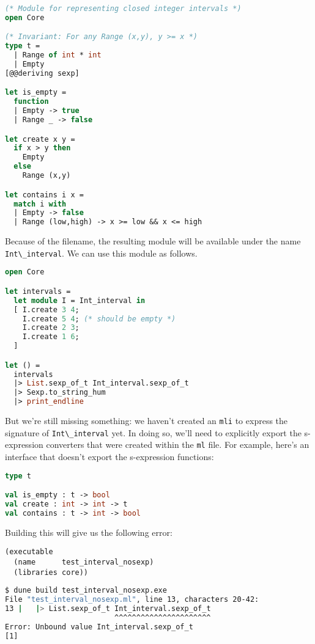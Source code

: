 \begin{lstlisting}[language=Caml]
(* Module for representing closed integer intervals *)
open Core

(* Invariant: For any Range (x,y), y >= x *)
type t =
  | Range of int * int
  | Empty
[@@deriving sexp]

let is_empty =
  function
  | Empty -> true
  | Range _ -> false

let create x y =
  if x > y then
    Empty
  else
    Range (x,y)

let contains i x =
  match i with
  | Empty -> false
  | Range (low,high) -> x >= low && x <= high
\end{lstlisting}

Because of the filename, the resulting module will be available under
the name \passthrough{\lstinline!Int\_interval!}. We can use this module
as follows.

\begin{lstlisting}[language=Caml]
open Core

let intervals =
  let module I = Int_interval in
  [ I.create 3 4;
    I.create 5 4; (* should be empty *)
    I.create 2 3;
    I.create 1 6;
  ]

let () =
  intervals
  |> List.sexp_of_t Int_interval.sexp_of_t
  |> Sexp.to_string_hum
  |> print_endline
\end{lstlisting}

But we're still missing something: we haven't created an
\passthrough{\lstinline!mli!} to express the signature of
\passthrough{\lstinline!Int\_interval!} yet. In doing so, we'll need to
explicitly export the s-expression converters that were created within
the \passthrough{\lstinline!ml!} file. For example, here's an interface
that doesn't export the s-expression functions:

\begin{lstlisting}[language=Caml]
type t

val is_empty : t -> bool
val create : int -> int -> t
val contains : t -> int -> bool
\end{lstlisting}

Building this will give us the following error:

\begin{lstlisting}
(executable
  (name      test_interval_nosexp)
  (libraries core))
\end{lstlisting}

\begin{lstlisting}[language=bash]
$ dune build test_interval_nosexp.exe
File "test_interval_nosexp.ml", line 13, characters 20-42:
13 |   |> List.sexp_of_t Int_interval.sexp_of_t
                         ^^^^^^^^^^^^^^^^^^^^^^
Error: Unbound value Int_interval.sexp_of_t
[1]
\end{lstlisting}

